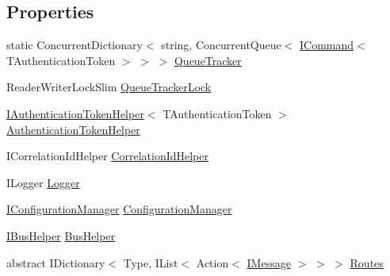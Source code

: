 \subsection*{Properties}
\begin{DoxyCompactItemize}
\item 
static Concurrent\+Dictionary$<$ string, Concurrent\+Queue$<$ \hyperlink{interfaceCqrs_1_1Commands_1_1ICommand}{I\+Command}$<$ T\+Authentication\+Token $>$ $>$ $>$ \hyperlink{classCqrs_1_1Bus_1_1QueuedCommandBusReceiver_a2fc62989429929acd8ea66808a8c4a78}{Queue\+Tracker}
\item 
Reader\+Writer\+Lock\+Slim \hyperlink{classCqrs_1_1Bus_1_1QueuedCommandBusReceiver_ac633e2d140fc90fab100acba4afa136b}{Queue\+Tracker\+Lock}
\item 
\hyperlink{interfaceCqrs_1_1Authentication_1_1IAuthenticationTokenHelper}{I\+Authentication\+Token\+Helper}$<$ T\+Authentication\+Token $>$ \hyperlink{classCqrs_1_1Bus_1_1QueuedCommandBusReceiver_a809cb92ece6c52bbbe3abc347be0470d}{Authentication\+Token\+Helper}
\item 
I\+Correlation\+Id\+Helper \hyperlink{classCqrs_1_1Bus_1_1QueuedCommandBusReceiver_a4cf8781cab9cb844892eb032cfca773f}{Correlation\+Id\+Helper}
\item 
I\+Logger \hyperlink{classCqrs_1_1Bus_1_1QueuedCommandBusReceiver_a0d0174c10f6cde11cd5a9d76092f3058}{Logger}
\item 
\hyperlink{interfaceCqrs_1_1Configuration_1_1IConfigurationManager}{I\+Configuration\+Manager} \hyperlink{classCqrs_1_1Bus_1_1QueuedCommandBusReceiver_acd7c3367d16742abd5e650f6bacf4df9}{Configuration\+Manager}
\item 
\hyperlink{interfaceCqrs_1_1Bus_1_1IBusHelper}{I\+Bus\+Helper} \hyperlink{classCqrs_1_1Bus_1_1QueuedCommandBusReceiver_acc1fa8c5074a43382bcf21805b4ee709}{Bus\+Helper}
\item 
abstract I\+Dictionary$<$ Type, I\+List$<$ Action$<$ \hyperlink{interfaceCqrs_1_1Messages_1_1IMessage}{I\+Message} $>$ $>$ $>$ \hyperlink{classCqrs_1_1Bus_1_1QueuedCommandBusReceiver_ad69fe38758694599261bad82e6c6378c}{Routes}

\end{DoxyCompactItemize}
